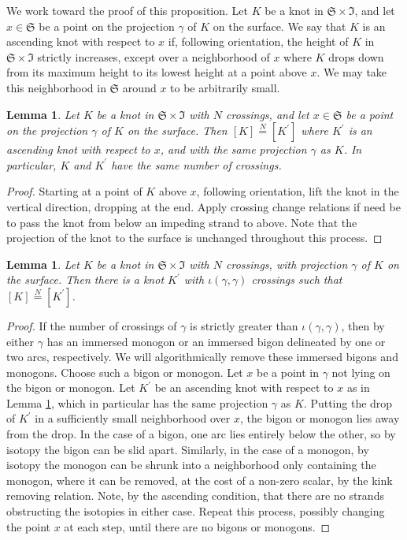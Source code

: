 \documentclass[12pt,
	]{amsart}
\newtheorem{lemma}[theorem]{Lemma}
\theoremstyle{definition}
\newcommand{\mfrak}[1]{\mathfrak{#1}}
\newcommand{\class}[1]{\left[#1\right]}
\newcommand{\surf}{\mfrak{S}}
\newcommand{\intt}{\mfrak{I}}
\newcommand{\indeq}{\overset{N}{=}}
\begin{document}
We work toward the proof of this proposition.  Let $K$ be a knot in $\surf\times\intt$, and let $x\in\surf$ be a point  on the projection $\gamma$ of $K$ on the surface.  We say that $K$ is an ascending knot with respect to $x$ if, following orientation, the height of $K$ in $\surf\times\intt$ strictly increases, except over a neighborhood of $x$ where $K$ drops down from its maximum height to its lowest height at a point above $x$.  We may take this neighborhood in $\surf$ around $x$ to be arbitrarily small.  

\begin{lemma}\label{lem:ascending-knot}
Let $K$ be a knot in $\surf\times\intt$ with $N$ crossings, and let $x\in\surf$ be a point on the projection $\gamma$ of $K$ on the surface.  Then $\class{K}\indeq\class{K^\prime}$ where $K^\prime$ is an ascending knot with respect to $x$, and with the same projection $\gamma$ as $K$.  In particular, $K$ and $K^\prime$ have the same number of crossings.  
\end{lemma}

\begin{proof}
Starting at a point of $K$ above $x$, following orientation, lift the knot in the vertical direction, dropping at the end.  Apply crossing change relations if need be to pass the knot from below an impeding strand to above.  Note that the projection of the knot to the surface is unchanged throughout this process.
\end{proof}

\begin{lemma}\label{lem:can-take-minimal-crossings}
Let $K$ be a knot in $\surf\times\intt$ with $N$ crossings, with projection $\gamma$ of $K$ on the surface.  Then there is a knot $K^\prime$ with $\iota(\gamma,\gamma)$ crossings such that $\class{K}\indeq\class{K^\prime}$.  
\end{lemma}

\begin{proof}
If the number of crossings of $\gamma$ is strictly greater than $\iota(\gamma,\gamma)$, then by \cite{hassMR0804478} either $\gamma$ has an immersed monogon or an immersed bigon delineated by one or two arcs, respectively.  We will algorithmically remove these immersed bigons and monogons.  Choose such a bigon or monogon.  Let $x$ be a point in $\gamma$ not lying on the bigon or monogon.  Let $K^\prime$ be an ascending knot with respect to $x$ as in Lemma \ref{lem:ascending-knot}, which in particular has the same projection $\gamma$ as $K$.  Putting the drop of $K^\prime$ in a sufficiently small neighborhood over $x$, the bigon or monogon lies away from the drop.  In the case of a bigon, one arc lies entirely below the other, so by isotopy the bigon can be slid apart.  Similarly, in the case of a monogon, by isotopy the monogon can be shrunk into a neighborhood only containing the monogon, where it can be removed, at the cost of a non-zero scalar, by the kink removing relation.   Note, by the ascending condition, that there are no strands obstructing the isotopies in either case.  Repeat this process, possibly changing the point $x$ at each step, until there are no bigons or monogons.  
\end{proof}
\end{document}
